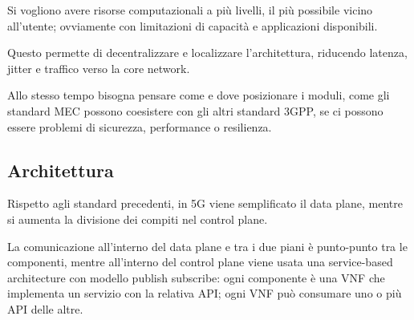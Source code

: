 Si vogliono avere risorse computazionali a più livelli, il più possibile vicino all'utente; ovviamente con limitazioni di capacità e applicazioni disponibili.

Questo permette di decentralizzare e localizzare l'architettura, riducendo latenza, jitter e traffico verso la core network.

Allo stesso tempo bisogna pensare come e dove posizionare i moduli, come gli standard MEC possono coesistere con gli altri standard 3GPP, se ci possono essere problemi di sicurezza, performance o resilienza.

\subsection{Architettura}

Rispetto agli standard precedenti, in 5G viene semplificato il data plane, mentre si aumenta la divisione dei compiti nel control plane.

La comunicazione all'interno del data plane e tra i due piani è punto-punto tra le componenti, mentre all'interno del control plane viene usata una service-based architecture con modello publish subscribe: ogni componente è una VNF che implementa un servizio con la relativa API; ogni VNF può consumare uno o più API delle altre. 

